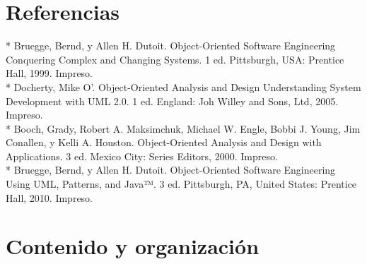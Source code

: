 \section{Referencias}

* Bruegge, Bernd, y Allen H. Dutoit. Object-Oriented Software Engineering Conquering Complex and Changing Systems. 1 ed. Pittsburgh, USA: Prentice Hall, 1999. Impreso. \\

* Docherty, Mike O'. Object-Oriented Analysis and Design Understanding System Development with UML 2.0. 1 ed. England: Joh Willey and Sons, Ltd, 2005. Impreso. \\

* Booch, Grady, Robert A. Maksimchuk, Michael W. Engle, Bobbi J. Young, Jim Conallen, y Kelli A.  Houston. Object-Oriented Analysis and Design with Applications. 3 ed. Mexico City: Series Editors, 2000. Impreso. \\

* Bruegge, Bernd, y Allen H. Dutoit. Object-Oriented Software Engineering Using UML, Patterns, and Java™. 3 ed. Pittsburgh, PA, United States: Prentice Hall, 2010. Impreso.

\section{Contenido y organización}
